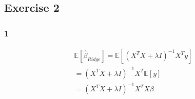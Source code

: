 \documentclass{article}
\begin{document}
\subsection{Exercise 2}
\subsubsection{1}
\begin{equation}
\begin{split}
    \mathbb{E}[\hat{\beta}_{Ridge}] = \mathbb{E}[(X^TX + \lambda I)^{-1}X^Ty]\\
    = (X^TX + \lambda I)^{-1}X^T\mathbb{E}[y]\\
    = (X^TX + \lambda I)^{-1}X^TX\beta\\
\end{split}
\end{equation}
\end{document}
